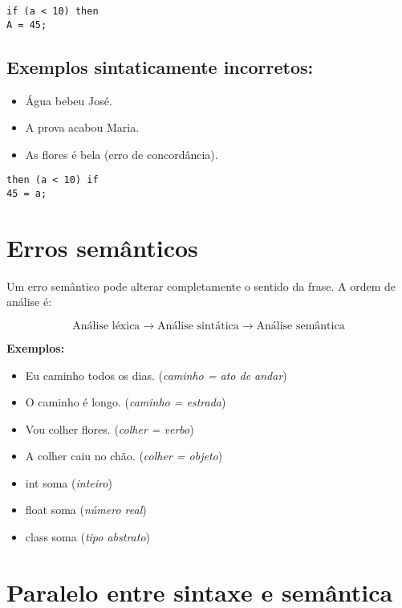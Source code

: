 \documentclass[12pt]{article}
\begin{document}
\begin{verbatim}
if (a < 10) then
A = 45;
\end{verbatim}

\subsection*{Exemplos sintaticamente incorretos:}
\begin{itemize}
    \item Água bebeu José.
    \item A prova acabou Maria.
    \item As flores é bela (erro de concordância).
\end{itemize}

\begin{verbatim}
then (a < 10) if
45 = a;
\end{verbatim}

\section*{Erros semânticos}

Um erro semântico pode alterar completamente o sentido da frase.  
A ordem de análise é:

\[
\text{Análise léxica} \rightarrow \text{Análise sintática} \rightarrow \text{Análise semântica}
\]

\textbf{Exemplos:}
\begin{itemize}
    \item Eu caminho todos os dias. \hfill (\textit{caminho = ato de andar})
    \item O caminho é longo. \hfill (\textit{caminho = estrada})
    \item Vou colher flores. \hfill (\textit{colher = verbo})
    \item A colher caiu no chão. \hfill (\textit{colher = objeto})
    \item int soma \hfill (\textit{inteiro})
    \item float soma \hfill (\textit{número real})
    \item class soma \hfill (\textit{tipo abstrato})
\end{itemize}

\section*{Paralelo entre sintaxe e semântica}
\end{document}

